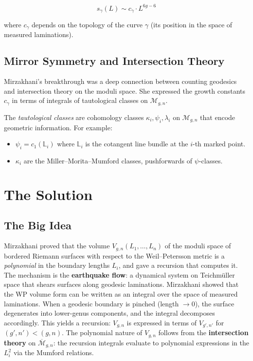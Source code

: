 \begin{equation}
s_\gamma(L) \sim c_\gamma \cdot L^{6g-6}
\end{equation}

where $c_\gamma$ depends on the topology of the curve $\gamma$ (its position in the space of measured laminations).

\subsection{Mirror Symmetry and Intersection Theory}

Mirzakhani's breakthrough was a deep connection between counting geodesics and intersection theory on the moduli space. She expressed the growth constants $c_\gamma$ in terms of integrals of tautological classes on $\mathcal{M}_{g,n}$.

The \emph{tautological classes} are cohomology classes $\kappa_i, \psi_i, \lambda_i$ on $\mathcal{M}_{g,n}$ that encode geometric information. For example:
\begin{itemize}
\item $\psi_i = c_1(\mathbb{L}_i)$ where $\mathbb{L}_i$ is the cotangent line bundle at the $i$-th marked point.
\item $\kappa_i$ are the Miller--Morita--Mumford classes, pushforwards of $\psi$-classes.
\end{itemize}

\section{The Solution}

\subsection{The Big Idea}
Mirzakhani proved that the volume $V_{g,n}(L_1, \ldots, L_n)$ of the moduli space of bordered Riemann surfaces with respect to the Weil--Petersson metric is a \emph{polynomial} in the boundary lengths $L_i$, and gave a recursion that computes it. The mechanism is the \textbf{earthquake flow}: a dynamical system on Teichmüller space that shears surfaces along geodesic laminations. Mirzakhani showed that the WP volume form can be written as an integral over the space of measured laminations. When a geodesic boundary is pinched (length $\to 0$), the surface degenerates into lower-genus components, and the integral decomposes accordingly. This yields a recursion: $V_{g,n}$ is expressed in terms of $V_{g',n'}$ for $(g',n') < (g,n)$. The polynomial nature of $V_{g,n}$ follows from the \textbf{intersection theory} on $\overline{\mathcal{M}}_{g,n}$: the recursion integrals evaluate to polynomial expressions in the $L_i^2$ via the Mumford relations.


